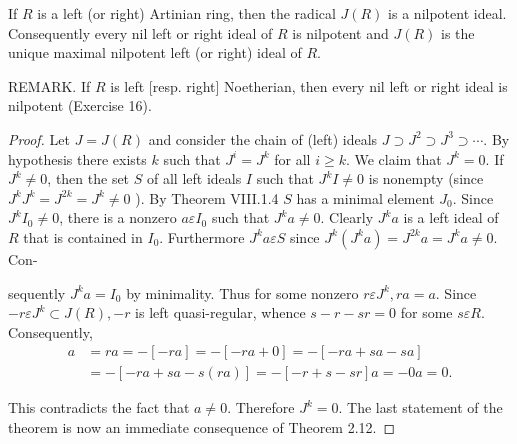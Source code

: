 \begin{proposition}
    If $R$ is a left (or right) Artinian ring, then the radical $J(R)$ is a nilpotent ideal. Consequently every nil left or right ideal of $R$ is nilpotent and $J(R)$ is the unique maximal nilpotent left (or right) ideal of $R$.

    REMARK. If $R$ is left [resp. right] Noetherian, then every nil left or right ideal is nilpotent (Exercise 16).

    \begin{proof}
        Let $J=J(R)$ and consider the chain of (left) ideals $J \supset J^2 \supset J^3 \supset \cdots$. By hypothesis there exists $k$ such that $J^i=J^k$ for all $i \geq k$. We claim that $J^k=0$. If $J^k \neq 0$, then the set $S$ of all left ideals $I$ such that $J^k I \neq 0$ is nonempty (since $J^k J^k=J^{2 k}=J^k \neq 0$ ). By Theorem VIII.1.4 $S$ has a minimal element $J_0$. Since $J^k I_0 \neq 0$, there is a nonzero $a \varepsilon I_0$ such that $J^k a \neq 0$. Clearly $J^k a$ is a left ideal of $R$ that is contained in $I_0$. Furthermore $J^k a \varepsilon S$ since $J^k\left(J^k a\right)=J^{2 k} a=J^k a \neq 0$. Con-

        sequently $J^k a=I_0$ by minimality. Thus for some nonzero $r \varepsilon J^k, r a=a$. Since $-r \varepsilon J^k \subset J(R),-r$ is left quasi-regular, whence $s-r-s r=0$ for some $s \varepsilon R$. Consequently,
        \begin{equation*}
            \begin{aligned}
                a & =r a=-[-r a]=-[-r a+0]=-[-r a+s a-s a]     \\
                  & =-[-r a+s a-s(r a)]=-[-r+s-s r] a=-0 a=0 .
            \end{aligned}
        \end{equation*}

        This contradicts the fact that $a \neq 0$. Therefore $J^k=0$. The last statement of the theorem is now an immediate consequence of Theorem 2.12.
    \end{proof}
\end{proposition}


